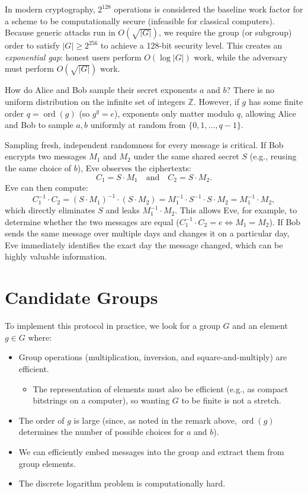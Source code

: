 In modern cryptography, \(2^{128}\) operations is considered the baseline work factor for a scheme to be computationally secure (infeasible for classical computers).
Because generic attacks run in \(O(\sqrt{|G|})\), we require the group (or subgroup) order to satisfy \(|G| \geq 2^{256}\) to achieve a 128-bit security level.
This creates an \emph{exponential gap}: honest users perform \(O(\log |G|)\) work, while the adversary must perform \(O(\sqrt{|G|})\) work.

\begin{remark}
    How do Alice and Bob sample their secret exponents \(a\) and \(b\)?
    There is no uniform distribution on the infinite set of integers \(\mathbb{Z}\).
    However, if \(g\) has some finite order \(q = \operatorname{ord}(g)\) (so \(g^q = e\)), exponents only matter modulo \(q\), allowing Alice and Bob to sample \(a, b\) uniformly at random from \(\{0, 1, \dots, q-1\}\).

    Sampling fresh, independent randomness for every message is critical.
    If Bob encrypts two messages \(M_1\) and \(M_2\) under the same shared secret \(S\) (e.g., reusing the same choice of \(b\)), Eve observes the ciphertexts:
    \[
        C_1 = S \cdot M_1 \quad \text{and} \quad C_2 = S \cdot M_2.
    \]
    Eve can then compute:
    \[
        C_1^{-1} \cdot C_2 = (S \cdot M_1)^{-1} \cdot (S \cdot M_2) = M_1^{-1} \cdot S^{-1} \cdot S \cdot M_2 = M_1^{-1} \cdot M_2,
    \]
    which directly eliminates \(S\) and leaks \(M_1^{-1} \cdot M_2\).
    This allows Eve, for example, to determine whether the two messages are equal (\(C_1^{-1} \cdot C_2 = e \iff M_1 = M_2\)).
    If Bob sends the same message over multiple days and changes it on a particular day, Eve immediately identifies the exact day the message changed, which can be highly valuable information.
\end{remark}

\section*{Candidate Groups}

To implement this protocol in practice, we look for a group \(G\) and an element \(g \in G\) where:
\begin{itemize}
    \item Group operations (multiplication, inversion, and square-and-multiply) are efficient.
    \begin{itemize}
        \item The representation of elements must also be efficient (e.g., as compact bitstrings on a computer), so wanting \(G\) to be finite is not a stretch.
    \end{itemize}
    \item The order of \(g\) is large (since, as noted in the remark above, \(\operatorname{ord}(g)\) determines the number of possible choices for \(a\) and \(b\)).
    \item We can efficiently embed messages into the group and extract them from group elements.
    \item The discrete logarithm problem is computationally hard.
\end{itemize}

